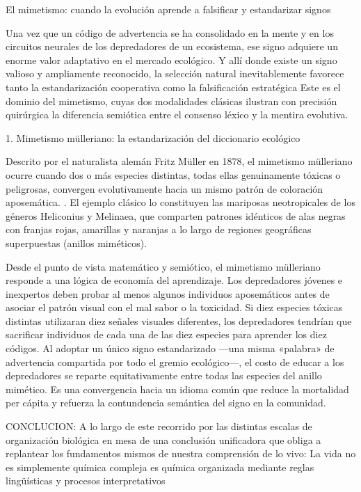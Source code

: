 El mimetismo: cuando la evolución aprende a falsificar y estandarizar signos

Una vez que un código de advertencia se ha consolidado en la mente y en los circuitos neurales de los depredadores de un ecosistema, ese signo adquiere un enorme valor adaptativo en el mercado ecológico. 
Y allí donde existe un signo valioso y ampliamente reconocido, la selección natural inevitablemente favorece tanto la estandarización cooperativa como la falsificación estratégica
Este es el dominio del mimetismo, cuyas dos modalidades clásicas ilustran con precisión quirúrgica la diferencia semiótica entre el consenso léxico y la mentira evolutiva.

1. Mimetismo mülleriano: la estandarización del diccionario ecológico

Descrito por el naturalista alemán Fritz Müller en 1878, el mimetismo mülleriano ocurre cuando dos o más especies distintas, todas ellas genuinamente tóxicas o peligrosas, convergen evolutivamente hacia un mismo patrón de coloración aposemática.
. El ejemplo clásico lo constituyen las mariposas neotropicales de los géneros Heliconius y Melinaea, que comparten patrones idénticos de alas negras con franjas rojas, amarillas y naranjas a lo largo de regiones geográficas superpuestas (anillos miméticos).

Desde el punto de vista matemático y semiótico, el mimetismo mülleriano responde a una lógica de economía del aprendizaje. 
Los depredadores jóvenes e inexpertos deben probar al menos algunos individuos aposemáticos antes de asociar el patrón visual con el mal sabor o la toxicidad. 
Si diez especies tóxicas distintas utilizaran diez señales visuales diferentes, los depredadores tendrían que sacrificar individuos de cada una de las diez especies para aprender los diez códigos. 
Al adoptar un único signo estandarizado —una misma «palabra» de advertencia compartida por todo el gremio ecológico—, el costo de educar a los depredadores se reparte equitativamente entre todas las especies del anillo mimético.
Es una convergencia hacia un idioma común que reduce la mortalidad per cápita y refuerza la contundencia semántica del signo en la comunidad.

CONCLUCION: A lo largo de este recorrido por las distintas escalas de organización biológica en mesa de una conclusión unificadora que obliga a replantear los fundamentos mismos de nuestra comprensión de lo vivo:
La vida no es simplemente química compleja es química organizada mediante reglas lingüísticas y procesos interpretativos

